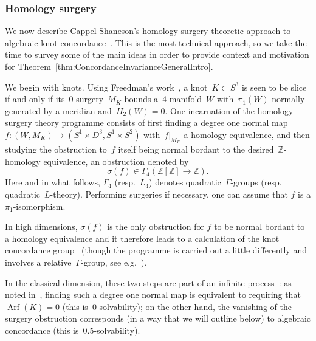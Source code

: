 \documentclass[10.9pt,a4paper]{amsart}
\theoremstyle{definition}
\theoremstyle{remark}
\newcommand{\Z}{\mathbb{Z}}
\begin{document}
\subsubsection*{Homology surgery}
We now describe Cappel-Shaneson's homology surgery theoretic approach to algebraic knot concordance~\cite{CappellShaneson}.
This is the most technical approach,  so we take the time to survey some of the main ideas in order to provide context and motivation for Theorem~\ref{thm:ConcordanceInvarianceGeneralIntro}.


We begin with knots.
Using Freedman's work~\cite{Freedman,FQ90}, a knot~$K \subset S^3$ is seen to be slice if and only if its~$0$-surgery~$M_K$ bounds a~$4$-manifold~$W$ with~$\pi_1(W)$ normally generated by a meridian and~$H_2(W)=0$.
One incarnation of the homology surgery theory programme consists of first finding a degree one normal map~$f \colon (W,M_K) \to (S^1 \times D^3,S^1 \times S^2)$ with~$f|_{M_K}$ a homology equivalence,
and then studying the obstruction to~$f$ itself being normal bordant to the desired~$\Z$-homology equivalence,
an obstruction denoted by
$$\sigma(f) \in \Gamma_4(\Z[\Z] \to \Z).$$
Here and in what follows,  $\Gamma_4$ (resp.~$L_4$) denotes quadratic~$\Gamma$-groups (resp. quadratic~$L$-theory).
Performing surgeries if necessary,  one can assume that $f$ is a $\pi_1$-isomorphism. 


In high dimensions,  $\sigma(f)$ is the only obstruction for $f$ to be normal bordant to a homology equivalence and it therefore leads to a calculation of the knot concordance group~\cite{CappellShaneson,CappellShanesonLinkCobordism} (though the programme is carried out a little differently and involves a relative~$\Gamma$-group, see e.g.~\cite[Lemma~3.1 and Theorem~4.1]{CappellShanesonLinkCobordism}).


In the classical dimension,  these two steps are part of an infinite process~\cite{CochranOrrTeichner}: as noted in~\cite[Proposition 23.19]{DET}, finding such a degree one normal map is equivalent to requiring that~$\operatorname{Arf}(K)=0$ (this is~$0$-solvability); on the other hand, the vanishing of the surgery obstruction corresponds (in a way that we will outline below) to algebraic concordance (this is~$0.5$-solvability).
\end{document}
